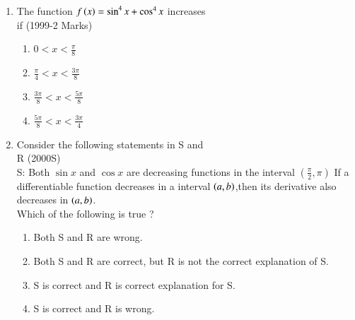\documentclass[journal,12pt,twocolumn]{IEEEtran}
\theoremstyle{remark}
\begin{document}
\begin{enumerate}[start=9]
\item The function $f\left(x\right)= \sin^4{x}+\cos^4{x}$ increases \\
	if \hfill (1999-2 Marks)
\begin{enumerate}
    \item $0<x<\frac{\pi}{8}$\\
    \item $\frac{\pi}{4}<x<\frac{3\pi}{8}$\\
    \item $\frac{3\pi}{8} <x<\frac{5\pi}{8}$\\
    \item $\frac{5\pi}{8}<x<\frac{3\pi}{4}$\\
\end{enumerate}
\item Consider the following statements in S and \\
R \hfill (2000S)\\
S: Both $\sin{x}$ and $\cos{x}$ are decreasing functions in the interval $\left(\frac{\pi}{2},\pi\right)$\: If a differentiable function decreases in a interval $\left(a,b\right)$,then its derivative also decreases in $\left(a,b\right)$.\\
Which of the following is true ?
\begin{enumerate}
    \item Both S and R are wrong.
    \item Both S and R are correct, but R is not the correct explanation of S.
    \item S is correct and R is correct explanation for S.
    \item S is correct and R is wrong.\\
\end{enumerate}


\end{enumerate}
\end{document}
